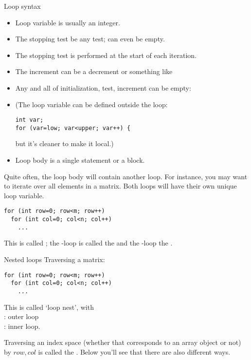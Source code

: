 \begin{slide}{Loop syntax}
  \label{sl:for-syntax}
  \begin{itemize}
  \item Loop variable is usually an integer.
  \item The stopping test be any test; can even be empty.
  \item The stopping test is performed at the start of each iteration.
  \item The increment can be a decrement or something like 
  \item Any and all of initialization, test, increment can be empty:\\
  \item (The loop variable can be defined outside the loop:
\begin{lstlisting}
int var;
for (var=low; var<upper; var++) {
\end{lstlisting}
but it's cleaner to make it local.)
\item Loop body is a single statement or a block.
  \end{itemize}
\end{slide}

Quite often, the loop body will contain another loop. For instance,
you may want to iterate over all elements in a matrix. Both loops will
have their own unique loop variable.
\begin{lstlisting}
for (int row=0; row<m; row++)
  for (int col=0; col<n; col++)
    ...
\end{lstlisting}
This is called ; 
the -loop is called the  and the
-loop the .

\begin{slide}{Nested loops}
  \label{sl:for-nest}
  Traversing a matrix:
\begin{lstlisting}
for (int row=0; row<m; row++)
  for (int col=0; col<n; col++)
    ...
\end{lstlisting}
This is called `loop nest', with\\
: outer loop\\
: inner loop.
\end{slide}

Traversing an index space (whether that corresponds to an array object
or not) by $row,col$ is called the .
Below you'll see that there are also different
ways.

